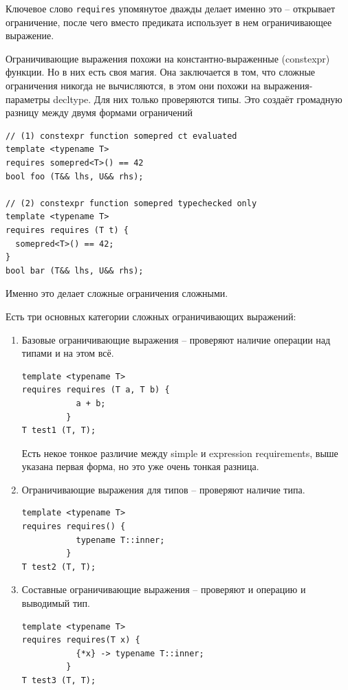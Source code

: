 \documentclass[a4paper,12pt,oneside]{book}
\begin{document}
Ключевое слово \lstinline!requires! упомянутое дважды делает именно это -- открывает ограничение, после чего вместо предиката использует в нем ограничивающее выражение.

Ограничивающие выражения похожи на константно-выраженные (constexpr) функции. Но в них есть своя магия. Она заключается в том, что сложные ограничения никогда не вычисляются, в этом они похожи на выражения-параметры decltype. Для них только проверяются типы. Это создаёт громадную разницу между двумя формами ограничений

\begin{lstlisting}
// (1) constexpr function somepred ct evaluated
template <typename T>
requires somepred<T>() == 42
bool foo (T&& lhs, U&& rhs);

// (2) constexpr function somepred typechecked only
template <typename T>
requires requires (T t) { 
  somepred<T>() == 42;
}
bool bar (T&& lhs, U&& rhs);
\end{lstlisting}

Именно это делает сложные ограничения сложными.

Есть три основных категории сложных ограничивающих выражений:

\begin{enumerate}
\item Базовые ограничивающие выражения -- проверяют наличие операции над типами и на этом всё.

\begin{lstlisting}
template <typename T>
requires requires (T a, T b) {
           a + b;
         }
T test1 (T, T);
\end{lstlisting}

Есть некое тонкое различие между simple и expression requirements, выше указана первая форма, но это уже очень тонкая разница.

\item Ограничивающие выражения для типов -- проверяют наличие типа.

\begin{lstlisting}
template <typename T>
requires requires() {
           typename T::inner;
         }
T test2 (T, T);
\end{lstlisting}

\item Составные ограничивающие выражения -- проверяют и операцию и выводимый тип.

\begin{lstlisting}
template <typename T>
requires requires(T x) {
           {*x} -> typename T::inner;
         }
T test3 (T, T);
\end{lstlisting}

\end{enumerate}
\end{document}
